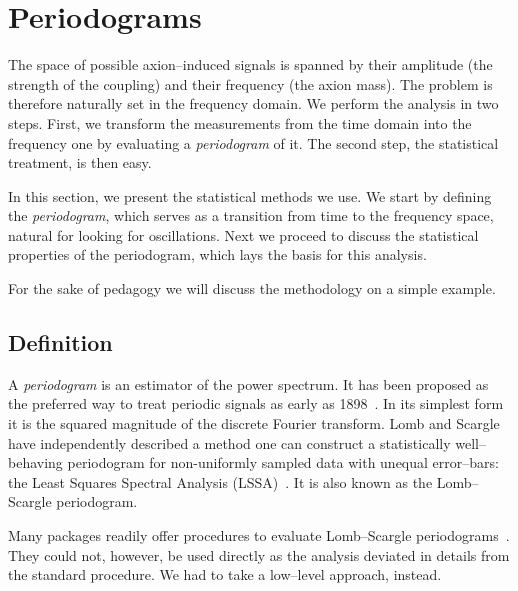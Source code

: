 \chapter{Periodograms}
\label{ch:axions-periodograms}
The space of possible axion--induced signals is spanned by their amplitude (the strength of the coupling) and their frequency (the axion mass). The problem is therefore naturally set in the frequency domain. We perform the analysis in two steps. First, we transform the measurements from the time domain into the frequency one by evaluating a \emph{periodogram} of it. The second step, the statistical treatment, is then easy.

In this section, we present the statistical methods we use. We start by defining the \emph{periodogram}, which serves as a transition from time to the frequency space, natural for looking for oscillations. Next we proceed to discuss the statistical properties of the periodogram, which lays the basis for this analysis.

For the sake of pedagogy we will discuss the methodology on a simple example.



\section{Definition}
A \emph{periodogram} is an estimator of the power spectrum. It has been proposed as the preferred way to treat periodic signals as early as 1898~\cite{Schuster1898}. In its simplest form it is the squared magnitude of the discrete Fourier transform. Lomb and Scargle have independently described a method one can construct a statistically well--behaving periodogram for non-uniformly sampled data with unequal error--bars: the Least Squares Spectral Analysis (LSSA)~\cite{Scargle1982}. It is also known as the Lomb--Scargle periodogram.

Many packages readily offer procedures to evaluate Lomb--Scargle periodograms~\cite{scipy,astropy}. They could not, however, be used directly as the analysis deviated in details from the standard procedure. We had to take a low--level approach, instead.


